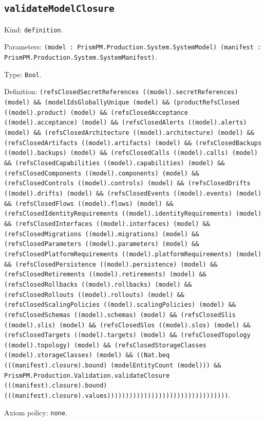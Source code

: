 \documentclass[11pt]{article}
\begin{document}
\subsection*{\texttt{validateModelClosure}}
\noindent Kind: \texttt{definition}.\par
\noindent Parameters: \texttt{(model : PrismPM.Production.System.SystemModel) (manifest : PrismPM.Production.System.SystemManifest)}.\par
\noindent Type: \texttt{Bool}.\par
\noindent Definition: \texttt{(refsClosedSecretReferences ((model).secretReferences) (model) \&\& (modelIdsGloballyUnique (model) \&\& (productRefsClosed ((model).product) (model) \&\& (refsClosedAcceptance ((model).acceptance) (model) \&\& (refsClosedAlerts ((model).alerts) (model) \&\& (refsClosedArchitecture ((model).architecture) (model) \&\& (refsClosedArtifacts ((model).artifacts) (model) \&\& (refsClosedBackups ((model).backups) (model) \&\& (refsClosedCalls ((model).calls) (model) \&\& (refsClosedCapabilities ((model).capabilities) (model) \&\& (refsClosedComponents ((model).components) (model) \&\& (refsClosedControls ((model).controls) (model) \&\& (refsClosedDrifts ((model).drifts) (model) \&\& (refsClosedEvents ((model).events) (model) \&\& (refsClosedFlows ((model).flows) (model) \&\& (refsClosedIdentityRequirements ((model).identityRequirements) (model) \&\& (refsClosedInterfaces ((model).interfaces) (model) \&\& (refsClosedMigrations ((model).migrations) (model) \&\& (refsClosedParameters ((model).parameters) (model) \&\& (refsClosedPlatformRequirements ((model).platformRequirements) (model) \&\& (refsClosedPersistence ((model).persistence) (model) \&\& (refsClosedRetirements ((model).retirements) (model) \&\& (refsClosedRollbacks ((model).rollbacks) (model) \&\& (refsClosedRollouts ((model).rollouts) (model) \&\& (refsClosedScalingPolicies ((model).scalingPolicies) (model) \&\& (refsClosedSchemas ((model).schemas) (model) \&\& (refsClosedSlis ((model).slis) (model) \&\& (refsClosedSlos ((model).slos) (model) \&\& (refsClosedTargets ((model).targets) (model) \&\& (refsClosedTopology ((model).topology) (model) \&\& (refsClosedStorageClasses ((model).storageClasses) (model) \&\& ((Nat.beq (((manifest).closure).bound) (modelEntityCount (model))) \&\& PrismPM.Production.Validation.validateClosure (((manifest).closure).bound) (((manifest).closure).values)))))))))))))))))))))))))))))))))}.\par
\noindent Axiom policy: \texttt{none}.\par
\end{document}
